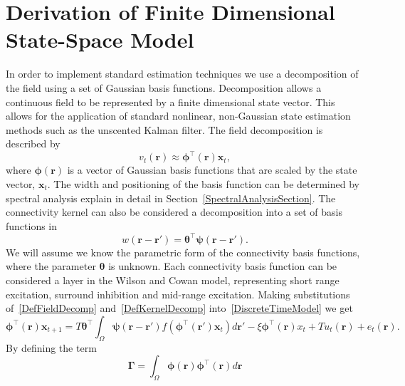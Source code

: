 \documentclass[12pt]{iopart}		%
\begin{document}
\section{Derivation of Finite Dimensional State-Space Model}
In order to implement standard estimation techniques we use a decomposition of the field using a set of Gaussian basis functions. Decomposition allows a continuous field to be represented by a finite dimensional state vector. This allows for the application of standard nonlinear, non-Gaussian state estimation methods such as the unscented Kalman filter. The field decomposition is described by
\begin{equation}\label{DefFieldDecomp}
	v_t\left(\mathbf{r}\right) \approx \boldsymbol{\phi}^{\top}\left(\mathbf{r}\right) \mathbf{x}_t,
\end{equation}
where $\mathbf{\boldsymbol{\phi}}(\mathbf{r})$ is a vector of Gaussian basis functions that are scaled by the state vector, $\mathbf{x}_t$. The width and positioning of the basis function can be determined by spectral analysis explain in detail in Section~\ref{SpectralAnalysisSection}. The connectivity kernel can also be considered a decomposition into a set of basis functions in 
\begin{equation}\label{DefKernelDecomp}
	w\left(\mathbf{r}-\mathbf{r}'\right) = \boldsymbol{\theta}^{\top} \boldsymbol{\psi}\left(\mathbf{r}-\mathbf{r}'\right).
\end{equation}
We will assume we know the parametric form of the connectivity basis functions, where the parameter $\boldsymbol{\theta}$ is unknown. Each connectivity basis function can be considered a layer in the Wilson and Cowan model, representing short range excitation, surround inhibition and mid-range excitation. Making substitutions of~\ref{DefFieldDecomp} and~\ref{DefKernelDecomp} into~\ref{DiscreteTimeModel} we get
\begin{equation}\label{reduced continuous model}
	\boldsymbol{\phi}^{\top}\left( \mathbf{r} \right) \mathbf{x}_{t+1} = T\boldsymbol{\theta}^{\top}\int_\Omega  {\boldsymbol{\psi} \left(\mathbf{r}-\mathbf{r}'\right) f\left( \boldsymbol{\phi} ^{\top}\left(\mathbf{r}'\right)\mathbf{x}_t \right)d\mathbf{r}'}  - \xi\boldsymbol{\phi}^{\top}\left(\mathbf{r}\right)x_t + T u_t\left(\mathbf{r}\right) + e_t\left(\mathbf{r}\right).
\end{equation}
By defining the term
\begin{equation}\label{DefGamma}
	\boldsymbol{\Gamma}  = \int_\Omega  {\boldsymbol{\phi} \left(\mathbf{r}\right)\boldsymbol{\phi} ^{\top}\left(\mathbf{r}\right)d\mathbf{r}}
\end{equation}
\end{document}
